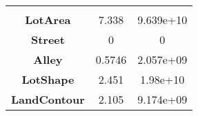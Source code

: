 \documentclass[]{article}
\begin{document}
\begin{longtable}[c]{@{}ccc@{}}
\begin{minipage}[t]{0.19\columnwidth}
\strut\end{minipage}\tabularnewline
\begin{minipage}[t]{0.25\columnwidth}\centering\strut
\textbf{LotArea}
\strut\end{minipage} &
\begin{minipage}[t]{0.16\columnwidth}\centering\strut
7.338
\strut\end{minipage} &
\begin{minipage}[t]{0.19\columnwidth}\centering\strut
9.639e+10
\strut\end{minipage}\tabularnewline
\begin{minipage}[t]{0.25\columnwidth}\centering\strut
\textbf{Street}
\strut\end{minipage} &
\begin{minipage}[t]{0.16\columnwidth}\centering\strut
0
\strut\end{minipage} &
\begin{minipage}[t]{0.19\columnwidth}\centering\strut
0
\strut\end{minipage}\tabularnewline
\begin{minipage}[t]{0.25\columnwidth}\centering\strut
\textbf{Alley}
\strut\end{minipage} &
\begin{minipage}[t]{0.16\columnwidth}\centering\strut
0.5746
\strut\end{minipage} &
\begin{minipage}[t]{0.19\columnwidth}\centering\strut
2.057e+09
\strut\end{minipage}\tabularnewline
\begin{minipage}[t]{0.25\columnwidth}\centering\strut
\textbf{LotShape}
\strut\end{minipage} &
\begin{minipage}[t]{0.16\columnwidth}\centering\strut
2.451
\strut\end{minipage} &
\begin{minipage}[t]{0.19\columnwidth}\centering\strut
1.98e+10
\strut\end{minipage}\tabularnewline
\begin{minipage}[t]{0.25\columnwidth}\centering\strut
\textbf{LandContour}
\strut\end{minipage} &
\begin{minipage}[t]{0.16\columnwidth}\centering\strut
2.105
\strut\end{minipage} &
\begin{minipage}[t]{0.19\columnwidth}\centering\strut
9.174e+09
\strut\end{minipage}\tabularnewline

\end{longtable}
\end{document}
